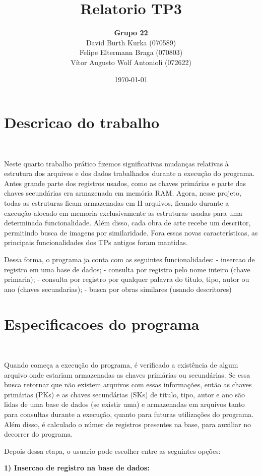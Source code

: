 \documentclass{article}
\title{\textbf{Relatorio TP3}}
\author{\textbf{Grupo 22} \\
  David Burth Kurka (070589) \\
  Felipe Eltermann Braga (070803) \\
  Vítor Augusto Wolf Antonioli (072622)}
\date{\today}
\begin{document}
\maketitle

\section{Descricao do trabalho}\

Neste quarto trabalho prático fizemos significativas mudanças relativas à estrutura dos arquivos e dos dados trabalhados durante a execução do programa. Antes grande parte dos registros usados, como as chaves primárias e parte das chaves secundárias era armazenada em memória RAM. Agora, nesse projeto, todas as estruturas ficam armazenadas em H arquivos, ficando durante a execução alocado em memoria exclusivamente as estruturas usadas para uma determinada funcionalidade.
Além disso, cada obra de arte recebe um descritor, permitindo busca de imagens por similaridade.
Fora essas novas características, as principais funcionalidades dos TPs antigos foram mantidas.

Dessa forma, o programa ja conta com as seguintes funcionalidades: 
- insercao de registro em uma base de dados; 
- consulta por registro pelo nome inteiro (chave primaria); 
- consulta por registro por qualquer palavra do titulo, tipo, autor ou ano (chaves secundarias); 
- busca por obras similares (usando descritores)



\section{Especificacoes do programa}\

Quando começa a execução do programa, é verificado a existência de algum arquivo onde estariam armazenadas as chaves primárias ou secundárias.
Se essa busca retornar que não existem arquivos com essas informações, então as chaves primárias (PKs) e as chaves secundárias (SKs) de titulo, tipo, autor e ano são lidas de uma base de dados (se existir uma) e armazenadas em arquivos tanto para consultas durante a execução, quanto para futuras utilizações do programa.
Além disso, é calculado o númer de registros presentes na base, para auxiliar no decorrer do programa.



Depois dessa etapa, o usuario pode escolher entre as seguintes opções:

\textbf{1) Insercao de registro na base de dados:}
\end{document}
